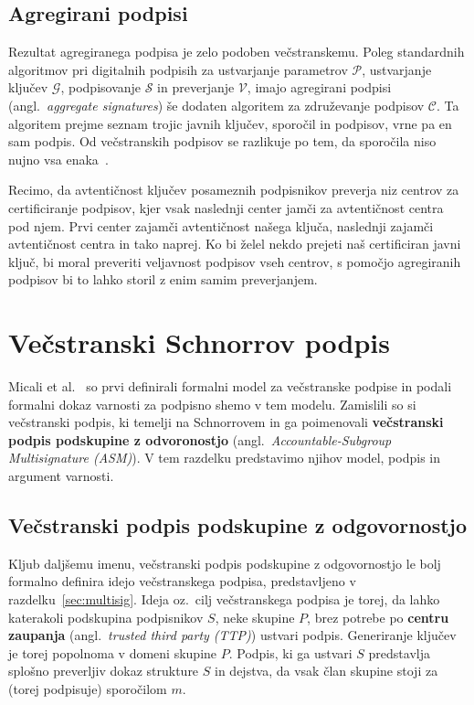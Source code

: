 \documentclass[isrm2, tisk]{fmfdelo}
\begin{document}
\subsection{Agregirani podpisi}
Rezultat agregiranega podpisa je zelo podoben večstranskemu. Poleg standardnih algoritmov pri digitalnih
podpisih za ustvarjanje parametrov $\mathcal{P}$, ustvarjanje ključev $\mathcal{G}$, podpisovanje 
$\mathcal{S}$ in preverjanje $\mathcal{V}$, imajo agregirani podpisi (angl.\ \textit{aggregate signatures})
še dodaten algoritem za združevanje podpisov $\mathcal{C}$. Ta algoritem prejme seznam trojic javnih
ključev, sporočil in podpisov, vrne pa en sam podpis. Od večstranskih podpisov se razlikuje po tem,
da sporočila niso nujno vsa enaka~\cite{boneh2011aggregate}.

\begin{primer}
    Recimo, da avtentičnost ključev posameznih podpisnikov preverja niz centrov za certificiranje
    podpisov, kjer vsak naslednji center jamči za avtentičnost centra pod njem. Prvi center zajamči
    avtentičnost našega ključa, naslednji zajamči avtentičnost centra in tako naprej. Ko bi želel
    nekdo prejeti naš certificiran javni ključ, bi moral preveriti veljavnost podpisov vseh centrov,
    s pomočjo agregiranih podpisov bi to lahko storil z enim samim preverjanjem.
\end{primer}

\section{Večstranski Schnorrov podpis}
\label{sec:multischnorr}
Micali et al.~\cite{micali2001asm} so prvi definirali formalni model za večstranske podpise in podali 
formalni dokaz varnosti za podpisno shemo v tem modelu. Zamislili so si večstranski podpis, ki temelji 
na Schnorrovem in ga poimenovali \textbf{večstranski podpis podskupine z odvoronostjo} (angl.\ 
\textit{Accountable-Subgroup Multisignature (ASM)}). V tem razdelku predstavimo njihov model, podpis 
in argument varnosti.

\subsection{Večstranski podpis podskupine z odgovornostjo}
Kljub daljšemu imenu, večstranski podpis podskupine z odgovornostjo le bolj formalno definira idejo 
večstranskega podpisa, predstavljeno v razdelku~\ref{sec:multisig}. Ideja oz.\ cilj večstranskega 
podpisa je torej, da lahko katerakoli podskupina podpisnikov $S$, neke skupine $P$, brez potrebe po 
\textbf{centru zaupanja} (angl.\ \textit{trusted third party (TTP)}) ustvari podpis. 
Generiranje ključev je torej popolnoma v domeni skupine $P$. Podpis, ki ga ustvari $S$ predstavlja 
splošno preverljiv dokaz strukture $S$ in dejstva, da vsak član skupine stoji za (torej podpisuje) 
sporočilom $m$.
\end{document}
